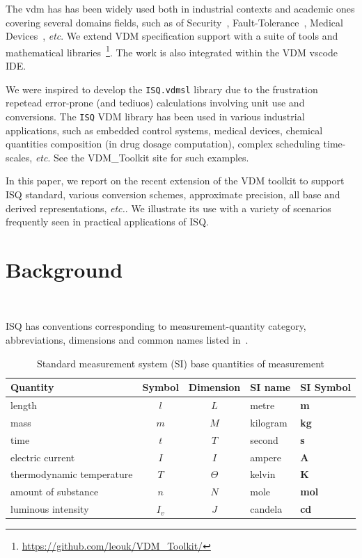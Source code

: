 \documentclass[runningheads,a4paper]{llncs}
\begin{document}
The \gls{vdm} has has been widely used both in industrial contexts and academic ones covering several domains fields, such as of Security~\cite{Kulik&20,Kulik&21a}, Fault-Tolerance~\cite{Nilsson&18}, Medical Devices~\cite{Macedo&08}, \textit{etc}. We extend VDM specification support with a suite of tools and mathematical libraries~\footnote{\url{https://github.com/leouk/VDM_Toolkit/}}. The work is also integrated within the VDM \gls{vscode} IDE.

We were inspired to develop the \texttt{ISQ.vdmsl} library due to the frustration repetead error-prone (and tediuos) calculations involving unit use and conversions. The \texttt{ISQ} VDM library has been used in various industrial applications, such as embedded control systems, medical devices, chemical quantities composition (in drug dosage computation), complex scheduling time-scales, \textit{etc}. See the VDM\_Toolkit site for such examples.     

In this paper, we report on the recent extension of the VDM toolkit to support ISQ standard, various conversion schemes, approximate precision, all base and derived representations, \textit{etc.}. We illustrate its use with a variety of scenarios frequently seen in practical applications of ISQ\@.    

\section{Background}~\label{sec:background}

\gls{ISQ} has conventions corresponding to measurement-quantity category, abbreviations, dimensions and common names listed in~.
%
\begin{table}[htbp]
    \centering
    \begin{tabular}{lccll}
        \toprule 
        \textbf{Quantity}         & \textbf{Symbol}& \textbf{Dimension}  & \textbf{SI name} & \textbf{SI Symbol}  \\ \hline 
        length                    & \(l\)          & \(L\)        &  metre	   & \textbf{m}   \\ \midrule
        mass                      & \(m\)	       & \(M\)	      &  kilogram  & \textbf{kg}  \\ \midrule
        time                      & \(t\)          & \(T\)        &  second    & \textbf{s}   \\ \midrule 
        electric current          & \(I\)	       & \(I\)	      &  ampere    & \textbf{A}	  \\ \midrule 
        thermodynamic temperature & \(T\)	       & \(\Theta\)   &  kelvin    & \textbf{K}	  \\ \midrule
        amount of substance       & \(n\)          & \(N\)        &  mole      & \textbf{mol} \\ \midrule
        luminous intensity        & \(I_v\)	       & \(J\)	      &  candela   & \textbf{cd}  \\
        \bottomrule
    \end{tabular}
    \caption{Standard measurement system (SI) base quantities of measurement}\label{tbl:SI}
\end{table} 
\end{document}
